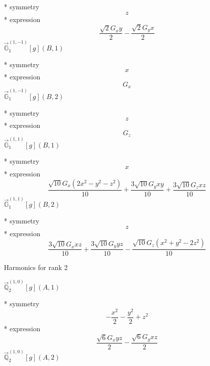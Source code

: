 \documentclass[fleqn,8pt]{jsarticle}
\begin{document}
\noindent\quad ** symmetry
\begin{dmath*}
z
\end{dmath*}
\noindent\quad ** expression
\begin{dmath*}
\frac{\sqrt{2} G_{x} y}{2} - \frac{\sqrt{2} G_{y} x}{2}
\end{dmath*}
\noindent\quad $\vec{\mathbb{G}}_{1}^{(1,-1)}[g](B,1)$

\noindent\quad ** symmetry
\begin{dmath*}
x
\end{dmath*}
\noindent\quad ** expression
\begin{dmath*}
G_{x}
\end{dmath*}
\noindent\quad $\vec{\mathbb{G}}_{1}^{(1,-1)}[g](B,2)$

\noindent\quad ** symmetry
\begin{dmath*}
z
\end{dmath*}
\noindent\quad ** expression
\begin{dmath*}
G_{z}
\end{dmath*}
\noindent\quad $\vec{\mathbb{G}}_{1}^{(1,1)}[g](B,1)$

\noindent\quad ** symmetry
\begin{dmath*}
x
\end{dmath*}
\noindent\quad ** expression
\begin{dmath*}
\frac{\sqrt{10} G_{x} \left(2 x^{2} - y^{2} - z^{2}\right)}{10} + \frac{3 \sqrt{10} G_{y} x y}{10} + \frac{3 \sqrt{10} G_{z} x z}{10}
\end{dmath*}
\noindent\quad $\vec{\mathbb{G}}_{1}^{(1,1)}[g](B,2)$

\noindent\quad ** symmetry
\begin{dmath*}
z
\end{dmath*}
\noindent\quad ** expression
\begin{dmath*}
\frac{3 \sqrt{10} G_{x} x z}{10} + \frac{3 \sqrt{10} G_{y} y z}{10} - \frac{\sqrt{10} G_{z} \left(x^{2} + y^{2} - 2 z^{2}\right)}{10}
\end{dmath*}

\noindent * Harmonics for rank 2

\noindent\quad $\vec{\mathbb{Q}}_{2}^{(1,0)}[g](A,1)$

\noindent\quad ** symmetry
\begin{dmath*}
- \frac{x^{2}}{2} - \frac{y^{2}}{2} + z^{2}
\end{dmath*}
\noindent\quad ** expression
\begin{dmath*}
\frac{\sqrt{6} G_{x} y z}{2} - \frac{\sqrt{6} G_{y} x z}{2}
\end{dmath*}
\noindent\quad $\vec{\mathbb{Q}}_{2}^{(1,0)}[g](A,2)$
\end{document}
